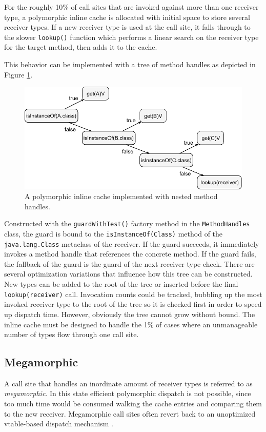 \smallskip

For the roughly 10\% of call sites that are invoked against more than one receiver type, a polymorphic inline cache is allocated with initial space to store several receiver types.  If a new receiver type is used at the call site, it falls through to the slower \texttt{lookup()} function which performs a linear search on the receiver type for the target method, then adds it to the cache.

This behavior can be implemented with a tree of method handles as depicted in Figure \ref{fig:guard-pic}.

\begin{figure}[htbp]
	\centering
    \includegraphics[width=\textwidth]{./Figures/guard-pic.pdf}
	\caption[Method Handle PIC]{A polymorphic inline cache implemented with nested method handles.}
  \label{fig:guard-pic}
\end{figure}

Constructed with the \texttt{guardWithTest()} factory method in the \texttt{MethodHandles} class, the guard is bound to the \texttt{isInstanceOf(Class)} method of the \texttt{java.lang.Class} metaclass of the receiver.  If the guard succeeds, it immediately invokes a method handle that references the concrete method.  If the guard fails, the fallback of the guard is the guard of the next receiver type check.  There are several optimization variations that influence how this tree can be constructed.  New types can be added to the root of the tree or inserted before the final \texttt{lookup(receiver)} call.  Invocation counts could be tracked, bubbling up the most invoked receiver type to the root of the tree so it is checked first in order to speed up dispatch time.  However, obviously the tree cannot grow without bound.  The inline cache must be designed to handle the 1\% of cases where an unmanageable number of types flow through one call site.

\subsection{Megamorphic}

A call site that handles an inordinate amount of receiver types is referred to as \emph{megamorphic}.  In this state efficient polymorphic dispatch is not possible, since too much time would be consumed walking the cache entries and comparing them to the new receiver.  Megamorphic call sites often revert back to an unoptimized vtable-based dispatch mechanism  \cite{hotspot-compiledcall}.
